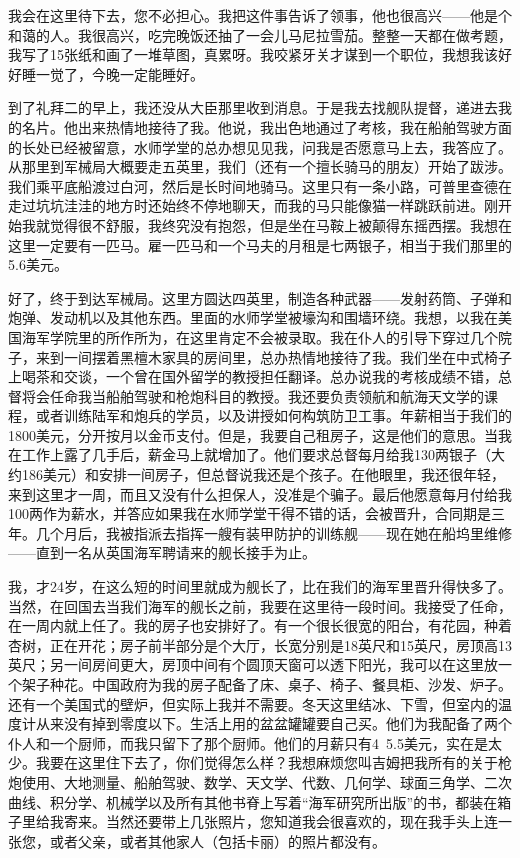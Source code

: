 \documentclass[12pt,UTF8]{ctexbook}
\begin{document}
我会在这里待下去，您不必担心。我把这件事告诉了领事，他也很高兴——他是个和蔼的人。我很高兴，吃完晚饭还抽了一会儿马尼拉雪茄。整整一天都在做考题，我写了15张纸和画了一堆草图，真累呀。我咬紧牙关才谋到一个职位，我想我该好好睡一觉了，今晚一定能睡好。

到了礼拜二的早上，我还没从大臣那里收到消息。于是我去找舰队提督，递进去我的名片。他出来热情地接待了我。他说，我出色地通过了考核，我在船舶驾驶方面的长处已经被留意，水师学堂的总办想见见我，问我是否愿意马上去，我答应了。从那里到军械局大概要走五英里，我们（还有一个擅长骑马的朋友）开始了跋涉。我们乘平底船渡过白河，然后是长时间地骑马。这里只有一条小路，可普里查德在走过坑坑洼洼的地方时还始终不停地聊天，而我的马只能像猫一样跳跃前进。刚开始我就觉得很不舒服，我终究没有抱怨，但是坐在马鞍上被颠得东摇西摆。我想在这里一定要有一匹马。雇一匹马和一个马夫的月租是七两银子，相当于我们那里的5.6美元。

好了，终于到达军械局。这里方圆达四英里，制造各种武器——发射药筒、子弹和炮弹、发动机以及其他东西。里面的水师学堂被壕沟和围墙环绕。我想，以我在美国海军学院里的所作所为，在这里肯定不会被录取。我在仆人的引导下穿过几个院子，来到一间摆着黑檀木家具的房间里，总办热情地接待了我。我们坐在中式椅子上喝茶和交谈，一个曾在国外留学的教授担任翻译。总办说我的考核成绩不错，总督将会任命我当船舶驾驶和枪炮科目的教授。我还要负责领航和航海天文学的课程，或者训练陆军和炮兵的学员，以及讲授如何构筑防卫工事。年薪相当于我们的1800美元，分开按月以金币支付。但是，我要自己租房子，这是他们的意思。当我在工作上露了几手后，薪金马上就增加了。他们要求总督每月给我130两银子（大约186美元）和安排一间房子，但总督说我还是个孩子。在他眼里，我还很年轻，来到这里才一周，而且又没有什么担保人，没准是个骗子。最后他愿意每月付给我100两作为薪水，并答应如果我在水师学堂干得不错的话，会被晋升，合同期是三年。几个月后，我被指派去指挥一艘有装甲防护的训练舰——现在她在船坞里维修——直到一名从英国海军聘请来的舰长接手为止。

我，才24岁，在这么短的时间里就成为舰长了，比在我们的海军里晋升得快多了。当然，在回国去当我们海军的舰长之前，我要在这里待一段时间。我接受了任命，在一周内就上任了。我的房子也安排好了。有一个很长很宽的阳台，有花园，种着杏树，正在开花；房子前半部分是个大厅，长宽分别是18英尺和15英尺，房顶高13英尺；另一间房间更大，房顶中间有个圆顶天窗可以透下阳光，我可以在这里放一个架子种花。中国政府为我的房子配备了床、桌子、椅子、餐具柜、沙发、炉子。还有一个美国式的壁炉，但实际上我并不需要。冬天这里结冰、下雪，但室内的温度计从来没有掉到零度以下。生活上用的盆盆罐罐要自己买。他们为我配备了两个仆人和一个厨师，而我只留下了那个厨师。他们的月薪只有4~5.5美元，实在是太少。我要在这里住下去了，你们觉得怎么样？我想麻烦您叫吉姆把我所有的关于枪炮使用、大地测量、船舶驾驶、数学、天文学、代数、几何学、球面三角学、二次曲线、积分学、机械学以及所有其他书脊上写着“海军研究所出版”的书，都装在箱子里给我寄来。当然还要带上几张照片，您知道我会很喜欢的，现在我手头上连一张您，或者父亲，或者其他家人（包括卡丽）的照片都没有。
\end{document}
